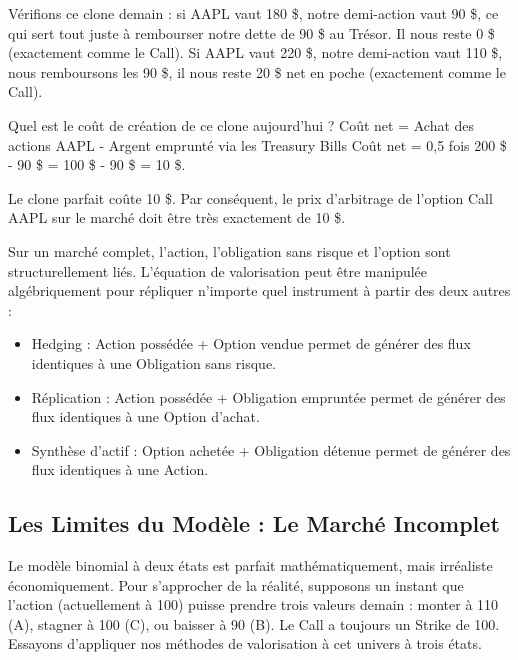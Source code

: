 \begin{examplebox}
Vérifions ce clone demain : si AAPL vaut 180 \$, notre demi-action vaut 90 \$, ce qui sert tout juste à rembourser notre dette de 90 \$ au Trésor. Il nous reste 0 \$ (exactement comme le Call). Si AAPL vaut 220 \$, notre demi-action vaut 110 \$, nous remboursons les 90 \$, il nous reste 20 \$ net en poche (exactement comme le Call).

Quel est le coût de création de ce clone aujourd'hui ?
Coût net = Achat des actions AAPL - Argent emprunté via les Treasury Bills
Coût net = 0,5 fois 200 \$ - 90 \$ = 100 \$ - 90 \$ = 10 \$.

Le clone parfait coûte 10 \$. Par conséquent, le prix d'arbitrage de l'option Call AAPL sur le marché doit être très exactement de 10 \$.
\end{examplebox}

Sur un marché complet, l'action, l'obligation sans risque et l'option sont structurellement liés. L'équation de valorisation peut être manipulée algébriquement pour répliquer n'importe quel instrument à partir des deux autres :
\begin{itemize}[label=$\rightarrow$]
    \item Hedging : Action possédée + Option vendue permet de générer des flux identiques à une Obligation sans risque.
    \item Réplication : Action possédée + Obligation empruntée permet de générer des flux identiques à une Option d'achat.
    \item Synthèse d'actif : Option achetée + Obligation détenue permet de générer des flux identiques à une Action.
\end{itemize}

\subsection{Les Limites du Modèle : Le Marché Incomplet}

Le modèle binomial à deux états est parfait mathématiquement, mais irréaliste économiquement. Pour s'approcher de la réalité, supposons un instant que l'action (actuellement à 100) puisse prendre trois valeurs demain : monter à 110 (A), stagner à 100 (C), ou baisser à 90 (B). Le Call a toujours un Strike de 100.
Essayons d'appliquer nos méthodes de valorisation à cet univers à trois états.

